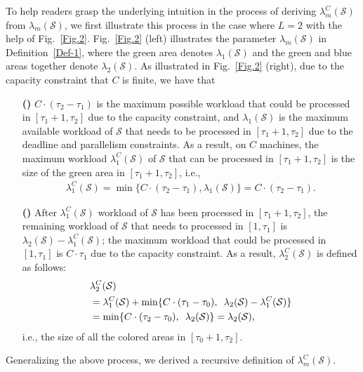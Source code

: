 \documentclass[10pt,journal,compsoc]{IEEEtran}
\newcommand{\rmnum}[1]{\romannumeral #1}
\begin{document}
To help readers grasp the underlying intuition in the process of deriving $\lambda_{m}^{C}(\mathcal{S})$ from $\lambda_{m}(\mathcal{S})$, we first illustrate this process in the case where $L=2$ with the help of Fig.~\ref{Fig.2}. Fig.~\ref{Fig.2} (left) illustrates the parameter $\lambda_{m}(\mathcal{S})$ in Definition~\ref{Def-1}, where the green area denotes $\lambda_{1}(\mathcal{S})$ and the green and blue areas together denote $\lambda_{2}(\mathcal{S})$. As illustrated in Fig.~\ref{Fig.2} (right), due to the capacity constraint that $C$ is finite, we have that
\begin{enumerate}
\item [\textbf{(\rmnum{1})}] $C\cdot(\tau_{2}-\tau_{1})$ is the maximum possible workload that could be processed in $[\tau_{1}+1, \tau_{2}]$ due to the capacity constraint, and $\lambda_{1}(\mathcal{S})$ is the maximum available workload of $\mathcal{S}$ that needs to be processed in $[\tau_{1}+1, \tau_{2}]$ due to the deadline and parallelism constraints. As a result, on $C$ machines, the maximum workload $\lambda_{1}^{C}(\mathcal{S})$ of $\mathcal{S}$ that can be processed in $[\tau_{1}+1, \tau_{2}]$ is the size of the green area in $[\tau_{1}+1, \tau_{2}]$, i.e.,
    \begin{align*}
    \lambda_{1}^{C}(\mathcal{S})  =\min\{C\cdot(\tau_{2}-\tau_{1}), \lambda_{1}(\mathcal{S})\}=C\cdot(\tau_{2}-\tau_{1}).
    \end{align*}

\item [\textbf{(\rmnum{2})}] After $\lambda_{1}^{C}(\mathcal{S})$ workload of $\mathcal{S}$ has been processed in $[\tau_{1}+1, \tau_{2}]$, the remaining workload of $\mathcal{S}$ that needs to processed in $[1, \tau_{1}]$ is $\lambda_{2}(\mathcal{S})-\lambda_{1}^{C}(\mathcal{S})$; the maximum workload that could be processed in $[1, \tau_{1}]$ is $C\cdot \tau_{1}$ due to the capacity constraint. As a result, $\lambda_{2}^{C}(\mathcal{S})$ is defined as follows:
\begin{align*}
& \lambda_{2}^{C}(\mathcal{S})\\
& =\lambda_{1}^{C}(\mathcal{S})+\min\{ C\cdot(\tau_{1}-\tau_{0}),\enskip \lambda_{2}(\mathcal{S})-\lambda_{1}^{C}(\mathcal{S}) \} \\
&=\min\{C\cdot(\tau_{2}-\tau_{0}), \enskip \lambda_{2}(\mathcal{S})\} = \lambda_{2}(\mathcal{S}),
\end{align*}
i.e., the size of all the colored areas in $[\tau_{0}+1, \tau_{2}]$.
\end{enumerate}
Generalizing the above process, we derived a recursive definition of $\lambda_{m}^{C}(\mathcal{S})$.
\end{document}
